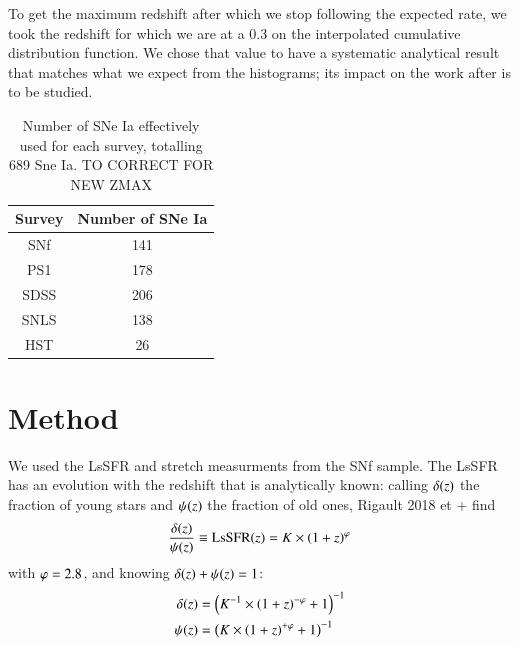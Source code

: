 \documentclass{aa}
\begin{document}
To get the maximum redshift after which we stop following the expected rate, we
took the redshift for which we are at a 0.3 on the interpolated cumulative
distribution function. We chose that value to have a systematic analytical
result that matches what we expect from the histograms; its impact on the work
after is to be studied.

\begin{table}[htbp!]
    \centering
    \caption{Number of SNe Ia effectively used for each survey, totalling 689
    Sne Ia. TO CORRECT FOR NEW ZMAX}
    \label{tab:sample}
    \begin{tabular}{c c}\hline
        \rowcolor{gray!15} Survey & Number of SNe Ia \\\hline
        SNf & 141 \\
        PS1 & 178 \\
        SDSS & 206 \\
        SNLS & 138 \\
        HST & 26 \\\hline
    \end{tabular}
\end{table}


\section{Method}

We used the LsSFR and stretch measurments from the SNf sample. The LsSFR has an
evolution with the redshift that is analytically known: calling $\delta(z)$ the
fraction of young stars and $\psi(z)$ the fraction of old ones, Rigault 2018 et +
find
\begin{equation}
    \frac{\delta(z)}{\psi(z)} \equiv \mathrm{LsSFR}(z) = K\times \left(1+z\right)^\varphi
\end{equation}
with $\varphi = 2.8$, and knowing $\delta(z) + \psi(z) = 1$:
\begin{align}
    \delta(z) & = \left(K^{-1}\times \left(1+z\right)^{-\varphi} +1\right)^{-1}\\
    \psi(z) & = \left(K\times \left(1+z\right)^{+\varphi} + 1\right)^{-1}
\end{align}
\end{document}
